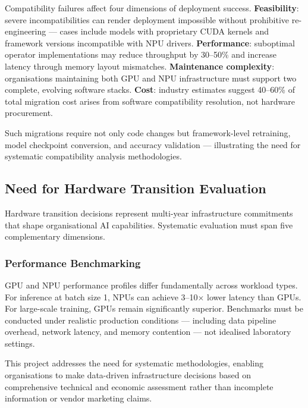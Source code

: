 Compatibility failures affect four dimensions of deployment success.
\textbf{Feasibility}: severe incompatibilities can render deployment impossible
without prohibitive re-engineering — cases include models with proprietary
CUDA kernels and framework versions incompatible with NPU drivers.
\textbf{Performance}: suboptimal operator implementations may reduce throughput
by 30–50\% and increase latency through memory layout mismatches.
\textbf{Maintenance complexity}: organisations maintaining both GPU and NPU
infrastructure must support two complete, evolving software stacks.
\textbf{Cost}: industry estimates suggest 40–60\% of total migration cost
arises from software compatibility resolution, not hardware procurement.

Such migrations require not only code changes but framework-level retraining,
model checkpoint conversion, and accuracy validation — illustrating the need
for systematic compatibility analysis methodologies.

\subsection{Need for Hardware Transition Evaluation}
\label{subsec:evaluation-need}

Hardware transition decisions represent multi-year infrastructure commitments
that shape organisational AI capabilities. Systematic evaluation must span
five complementary dimensions.

\subsubsection{Performance Benchmarking}

GPU and NPU performance profiles differ fundamentally across workload types.
For inference at batch size 1, NPUs can achieve 3–10$\times$ lower latency
than GPUs. For large-scale training, GPUs remain significantly superior.
Benchmarks must be conducted under realistic production conditions — including
data pipeline overhead, network latency, and memory contention — not idealised
laboratory settings.

This project addresses the need for systematic methodologies, enabling
organisations to make data-driven infrastructure decisions based on
comprehensive technical and economic assessment rather than incomplete
information or vendor marketing claims.
